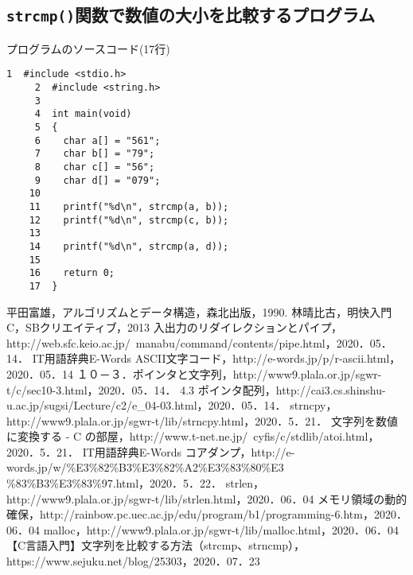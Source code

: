 \subsection{\texttt{strcmp()}関数で数値の大小を比較するプログラム}\label{funccmp}
プログラムのソースコード(17行)
\begin{Verbatim}[fontsize=\small, baselinestretch=0.8]
     1	#include <stdio.h>
     2	#include <string.h>
     3	
     4	int main(void)
     5	{
     6	  char a[] = "561";
     7	  char b[] = "79";
     8	  char c[] = "56";
     9	  char d[] = "079";
    10	
    11	  printf("%d\n", strcmp(a, b));
    12	  printf("%d\n", strcmp(c, b));
    13	
    14	  printf("%d\n", strcmp(a, d));
    15	
    16	  return 0;
    17	}
\end{Verbatim}

\begin{thebibliography}{99}
   平田富雄，アルゴリズムとデータ構造，森北出版，1990.
   林晴比古，明快入門C，SBクリエイティブ，2013
   入出力のリダイレクションとパイプ，http://web.sfc.keio.ac.jp/~manabu/command/contents/pipe.html，2020．05．14．
   IT用語辞典E-Words ASCII文字コード，http://e-words.jp/p/r-ascii.html，2020．05．14
   １０－３．ポインタと文字列，http://www9.plala.or.jp/sgwr-t/c/sec10-3.html，2020．05．14．
   4.3 ポインタ配列，http://cai3.cs.shinshu-u.ac.jp/sugsi/Lecture/c2/e\_04-03.html，2020．05．14．%
   strncpy，http://www9.plala.or.jp/sgwr-t/lib/strncpy.html，2020．5．21．
   文字列を数値に変換する - C の部屋，http://www.t-net.ne.jp/~cyfis/c/stdlib/atoi.html，2020．5．21．
   IT用語辞典E-Words コアダンプ，http://e-words.jp/w/\%E3\%82\%B3\%E3\%82\%A2\%E3\%83\%80\%E3
\%83\%B3\%E3\%83\%97.html，2020．5．22．%
   strlen，http://www9.plala.or.jp/sgwr-t/lib/strlen.html，2020．06．04
   メモリ領域の動的確保，http://rainbow.pc.uec.ac.jp/edu/program/b1/programming-6.htm，2020．06．04
   malloc，http://www9.plala.or.jp/sgwr-t/lib/malloc.html，2020．06．04
   【C言語入門】文字列を比較する方法（strcmp、strncmp），https://www.sejuku.net/blog/25303，2020．07．23
\end{thebibliography}


